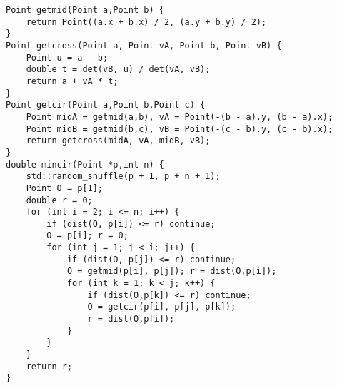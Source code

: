 \begin{lstlisting}
Point getmid(Point a,Point b) {
	return Point((a.x + b.x) / 2, (a.y + b.y) / 2);
}
Point getcross(Point a, Point vA, Point b, Point vB) {
	Point u = a - b;
	double t = det(vB, u) / det(vA, vB);
	return a + vA * t;
}
Point getcir(Point a,Point b,Point c) {
	Point midA = getmid(a,b), vA = Point(-(b - a).y, (b - a).x);
	Point midB = getmid(b,c), vB = Point(-(c - b).y, (c - b).x);
	return getcross(midA, vA, midB, vB);
}
double mincir(Point *p,int n) {
	std::random_shuffle(p + 1, p + n + 1);
	Point O = p[1];
	double r = 0;
	for (int i = 2; i <= n; i++) {
		if (dist(O, p[i]) <= r) continue;
		O = p[i]; r = 0;
		for (int j = 1; j < i; j++) {
			if (dist(O, p[j]) <= r) continue;
			O = getmid(p[i], p[j]); r = dist(O,p[i]);
			for (int k = 1; k < j; k++) {
				if (dist(O,p[k]) <= r) continue;
				O = getcir(p[i], p[j], p[k]);
				r = dist(O,p[i]);
			}
		}
	}
	return r;
}
\end{lstlisting}
